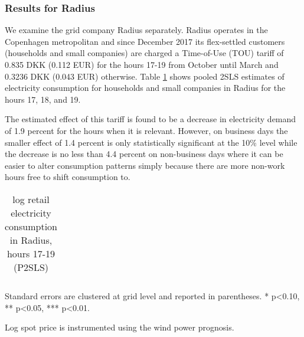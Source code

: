 \subsubsection{Results for Radius}
We examine the grid company Radius separately. Radius operates in the Copenhagen metropolitan and since December 2017 its flex-settled customers (households and small companies) are charged a Time-of-Use (TOU) tariff of 0.835 DKK (0.112 EUR) for the hours 17-19 from October until March and 0.3236 DKK (0.043 EUR) otherwise. Table \ref{tab:r_radius} shows pooled 2SLS estimates of electricity consumption for households and small companies in Radius for the hours 17, 18, and 19.
\par
The estimated effect of this tariff is found to be a decrease in electricity demand of 1.9 percent for the hours when it is relevant. However, on business days the smaller effect of 1.4 percent is only statistically significant at the 10\% level while the decrease is no less than 4.4 percent on non-business days where it can be easier to alter consumption patterns simply because there are more non-work hours free to shift consumption to.
\begin{table}[H]
\begin{threeparttable}
  \vspace{-0.0cm}
  \centering
  \caption{log retail electricity consumption in Radius, hours 17-19 (P2SLS)}
  \label{tab:r_radius}
      \footnotesize
  \begin{tabular}{lccc}
        
  \end{tabular}
    \begin{tablenotes}
        \item  Standard errors are clustered at grid level and reported in parentheses. * p<0.10, ** p<0.05, *** p<0.01.
         \item Log spot price is instrumented using the wind power prognosis.
    \end{tablenotes}
  \vspace{-0.0cm}
  \end{threeparttable}
\end{table}


